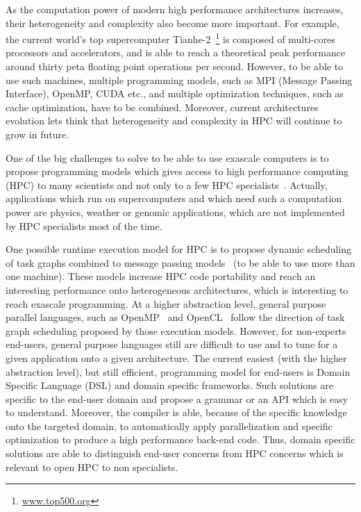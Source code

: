 As the computation power of modern high performance architectures increases, their heterogeneity and complexity also become more important. For example, the current world's top supercomputer Tianhe-2~\footnote{\url{www.top500.org}} is composed of multi-cores processors and accelerators, and is able to reach a theoretical peak performance around thirty peta floating point operations per second. However, to be able to use such machines, multiple programming models, such as MPI (Message Passing Interface), OpenMP, CUDA etc., and multiple optimization techniques, such as cache optimization, have to be combined. Moreover, current architectures evolution lets think that heterogeneity and complexity in HPC will continue to grow in future.

One of the big challenges to solve to be able to use exascale computers is to propose programming models which gives access to high performance computing (HPC) to many scientists and not only to a few HPC specialists~\cite{ETP4HPC2013}. Actually, applications which run on supercomputers and which need such a computation power are physics, weather or genomic applications, which are not implemented by HPC specialists most of the time.

One possible runtime execution model for HPC is to propose dynamic scheduling of task graphs combined to message passing models~\cite{Gautier:2013:XRS:2510661.2511383,Augonnet2011,wu:hal-01078359} (to be able to use more than one machine). These models increase HPC code portability and reach an interesting performance onto heterogeneous architectures, which is interesting to reach exascale programming. At a higher abstraction level, general purpose parallel languages, such as OpenMP~\cite{660313} and OpenCL~\cite{Stone:2010:OPP:622179.1803953} follow the direction of task graph scheduling proposed by those execution models. However, for non-experts end-users, general purpose languages still are difficult to use and to tune for a given application onto a given architecture. The current easiest (with the higher abstraction level), but still efficient, programming model for end-users is Domain Specific Language (DSL) and domain specific frameworks. Such solutions are specific to the end-user domain and propose a grammar or an API which is easy to understand. Moreover, the compiler is able, because of the specific knowledge onto the targeted domain, to automatically apply parallelization and specific optimization to produce a high performance back-end code. Thus, domain specific solutions are able to distinguish end-user concerns from HPC concerns which is relevant to open HPC to non specialists.

